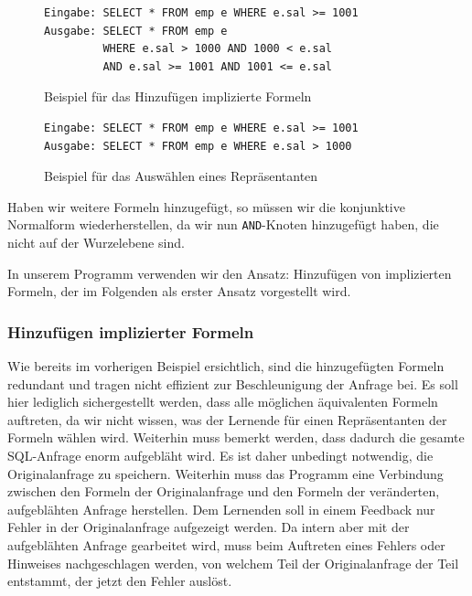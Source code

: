 \begin{figure}[h]
\centering
\begin{verbatim}
Eingabe: SELECT * FROM emp e WHERE e.sal >= 1001
Ausgabe: SELECT * FROM emp e 
         WHERE e.sal > 1000 AND 1000 < e.sal
         AND e.sal >= 1001 AND 1001 <= e.sal
\end{verbatim}
\caption{Beispiel für das Hinzufügen implizierte Formeln}
\label{fig:sampleadd}
\end{figure}

\begin{figure}[h]
\centering
\begin{verbatim}
Eingabe: SELECT * FROM emp e WHERE e.sal >= 1001
Ausgabe: SELECT * FROM emp e WHERE e.sal > 1000
\end{verbatim}
\caption{Beispiel für das Auswählen eines Repräsentanten}
\label{fig:samplerep}
\end{figure}

Haben wir weitere Formeln hinzugefügt, so müssen wir die konjunktive Normalform wiederherstellen, da wir nun \verb|AND|-Knoten hinzugefügt haben, die nicht auf der Wurzelebene sind. 

In unserem Programm verwenden wir den Ansatz: Hinzufügen von implizierten Formeln, der im Folgenden als erster Ansatz vorgestellt wird.

\subsubsection{Hinzufügen implizierter Formeln}
\label{subsubsec:implicitformulas}

Wie bereits im vorherigen Beispiel ersichtlich, sind die hinzugefügten Formeln redundant und tragen nicht effizient zur Beschleunigung der Anfrage bei. Es soll hier lediglich sichergestellt werden, dass alle möglichen äquivalenten Formeln auftreten, da wir nicht wissen, was der Lernende für einen Repräsentanten der Formeln wählen wird. Weiterhin muss bemerkt werden, dass dadurch die gesamte SQL-Anfrage enorm aufgebläht wird. Es ist daher unbedingt notwendig, die Originalanfrage zu speichern. Weiterhin muss das Programm eine Verbindung zwischen den Formeln der Originalanfrage und den Formeln der veränderten, aufgeblähten Anfrage herstellen. Dem Lernenden soll in einem Feedback nur Fehler in der Originalanfrage aufgezeigt werden. Da intern aber mit der aufgeblähten Anfrage gearbeitet wird, muss beim Auftreten eines Fehlers oder Hinweises nachgeschlagen werden, von welchem Teil der Originalanfrage der Teil entstammt, der jetzt den Fehler auslöst.

